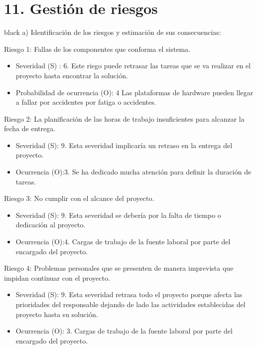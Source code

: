 \documentclass[
11pt, %
codirector, %
]{charter}
\begin{document}
\section{11. Gestión de riesgos}
\label{sec:riesgos}

\begin{consigna}{black}
a) Identificación de los riesgos y estimación de sus consecuencias:
 
Riesgo 1: Fallas de los componentes que conforma el sistema.
\begin{itemize}
	\item Severidad (S) : 6. Este riego puede retrasar las tareas que se va realizar en el proyecto hasta encontrar la solución.
	\item Probabilidad de ocurrencia (O): 4 Las plataformas de hardware pueden llegar a fallar por accidentes por fatiga o accidentes.

\end{itemize}   

Riesgo 2: La planificación de las horas de trabajo insuficientes para alcanzar la fecha de entrega.

\begin{itemize}
	\item Severidad (S):  9. Esta severidad  implicaría un retraso en la entrega del proyecto.
	\item Ocurrencia (O):3. Se ha dedicado mucha atención para definir la duración de tareas.
\end{itemize}

Riesgo 3: No cumplir con el alcance del proyecto.
\begin{itemize}
	\item Severidad (S): 9. Esta severidad se debería  por la falta de tiempo o dedicación al proyecto.
	\item Ocurrencia (O):4. Cargas de trabajo de la fuente laboral  por parte del encargado del proyecto.
\end{itemize}

Riesgo 4: Problemas personales que se presenten de manera imprevista que impidan continuar con el proyecto.
\begin{itemize}
	\item Severidad (S): 9. Esta severidad retrasa todo el proyecto porque afecta las prioridades del responsable dejando de lado las actividades establecidas del proyecto hasta su solución.
	\item Ocurrencia (O): 3. Cargas de trabajo de la fuente laboral  por parte del encargado del proyecto.
\end{itemize}


\end{consigna}
\end{document}
